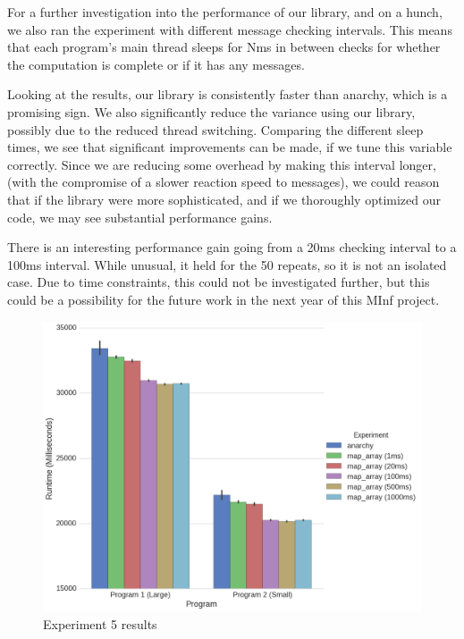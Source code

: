 For a further investigation into the performance of our library, and on a hunch, we also ran the experiment with different message checking intervals. This means that each program's main thread sleeps for Nms in between checks for whether the computation is complete or if it has any messages.

Looking at the results, our library is consistently faster than anarchy, which is a promising sign. We also significantly reduce the variance using our library, possibly due to the reduced thread switching. Comparing the different sleep times, we see that significant improvements can be made, if we tune this variable correctly. Since we are reducing some overhead by making this interval longer, (with the compromise of a slower reaction speed to messages), we could reason that if the library were more sophisticated, and if we thoroughly optimized our code, we may see substantial performance gains.

There is an interesting performance gain going from a 20ms checking interval to a 100ms interval. While unusual, it held for the 50 repeats, so it is not an isolated case. Due to time constraints, this could not be investigated further, but this could be a possibility for the future work in the next year of this MInf project.



\begin{figure}
	\centering
	\includegraphics[width=\textwidth]{graphics/experiment5.png}
	\caption{Experiment 5 results}
	\label{fig:results_ex5}
\end{figure}

